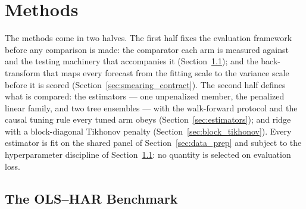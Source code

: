 \section{Methods}
\label{sec:methods}


The methods come in two halves. The first half fixes the evaluation
framework before any comparison is made: the comparator each arm is
measured against and the testing machinery that accompanies it
(Section~\ref{sec:dp_benchmark}); and the back-transform that maps every
forecast from the fitting scale to the variance scale before it is
scored (Section~\ref{sec:smearing_contract}). The second
half defines what is compared: the estimators --- one unpenalized
member, the penalized linear family, and two tree ensembles --- with the
walk-forward protocol and the causal tuning rule every tuned arm obeys
(Section~\ref{sec:estimators}); and ridge with a block-diagonal
Tikhonov penalty
(Section~\ref{sec:block_tikhonov}).
Every estimator is fit on the shared panel of
Section~\ref{sec:data_prep} and subject to the hyperparameter discipline
of Section~\ref{sec:dp_benchmark}: no quantity is selected on evaluation
loss.

\subsection{The OLS--HAR Benchmark}
\label{sec:dp_benchmark}

